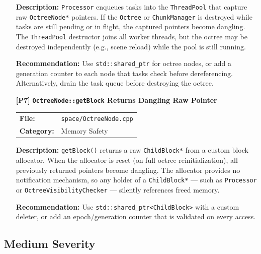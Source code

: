 \documentclass[a4paper,12pt]{article}
\newcommand{\severitybox}[2]{%
  \colorbox{#1}{\makebox[2.5cm][c]{\textcolor{white}{\textbf{#2}}}}%
}
\begin{document}
\begin{enumerate}[leftmargin=*]
  \textbf{Description:}
  \texttt{Processor} enqueues tasks into the \texttt{ThreadPool} that capture
  raw \texttt{OctreeNode*} pointers. If the \texttt{Octree} or
  \texttt{ChunkManager} is destroyed while tasks are still pending or in
  flight, the captured pointers become dangling. The \texttt{ThreadPool}
  destructor joins all worker threads, but the octree may be destroyed
  independently (e.g., scene reload) while the pool is still running.

  \textbf{Recommendation:}
  Use \texttt{std::shared\_ptr} for octree nodes, or add a generation counter
  to each node that tasks check before dereferencing. Alternatively, drain
  the task queue before destroying the octree.

\item[\textbf{[P7]}] \textbf{\texttt{OctreeNode::getBlock} Returns Dangling Raw Pointer}
  \hfill \severitybox{highcolor}{HIGH}

  \begin{tabular}{ll}
    \textbf{File:} & \texttt{space/OctreeNode.cpp} \\
    \textbf{Category:} & Memory Safety \\
  \end{tabular}

  \textbf{Description:}
  \texttt{getBlock()} returns a raw \texttt{ChildBlock*} from a custom
  block allocator. When the allocator is reset (on full octree
  reinitialization), all previously returned pointers become dangling. The
  allocator provides no notification mechanism, so any holder of a
  \texttt{ChildBlock*} — such as \texttt{Processor} or
  \texttt{OctreeVisibilityChecker} — silently references freed memory.

  \textbf{Recommendation:}
  Use \texttt{std::shared\_ptr<ChildBlock>} with a custom deleter, or add an
  epoch/generation counter that is validated on every access.

\end{enumerate}

\newpage

\subsection{Medium Severity}
\end{document}
